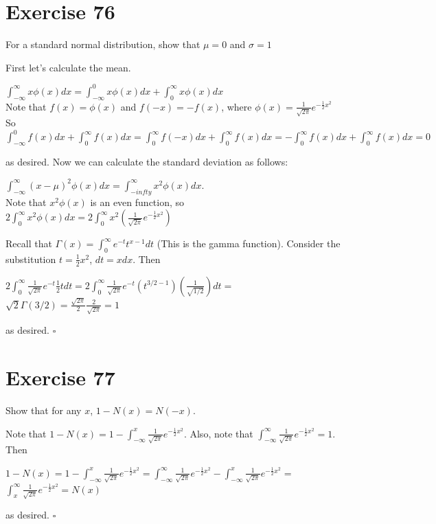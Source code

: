 \documentclass{article}
\begin{document}
\section*{Exercise 76}
For a standard normal distribution, show that $\mu = 0$ and $\sigma = 1$
\begin{flushleft}
    First let's calculate the mean.
    \begin{center}
        $\int_{-\infty}^{\infty} x \phi(x)dx = \int_{-\infty}^{0} x \phi(x)dx + \int_{0}^{\infty} x \phi(x)dx$ \\
        Note that $f(x) = \phi(x)$ and $f(-x) = -f(x)$, where $\phi(x) = \frac{1}{\sqrt{2\pi}} e^{-\frac{1}{2} x^2}$ \\
        So $\int_{-\infty}^{0}f(x)dx + \int_{0}^{\infty}f(x)dx = \int_{0}^{\infty}f(-x)dx + \int_{0}^{\infty}f(x)dx = -\int_{0}^{\infty}f(x)dx + \int_{0}^{\infty}f(x)dx = 0$
    \end{center}
    as desired. Now we can calculate the standard deviation as follows:
    \begin{center}
        $\int_{-\infty}^{\infty} (x-\mu)^2 \phi(x)dx = \int_{-infty}^{\infty} x^2 \phi(x)dx$. \\
        Note that $x^2 \phi(x)$ is an even function, so \\
        $2 \int_{0}^{\infty} x^2 \phi(x)dx = 2\int_{0}^{\infty} x^2 (\frac{1}{\sqrt{2\pi}}e^{-\frac{1}{2} x^2})$
    \end{center}
    Recall that $\Gamma(x) = \int_{0}^{\infty}e^{-t}t^{x-1}dt$ (This is the gamma function). Consider the substitution $t = \frac{1}{2}x^2$, $dt = xdx$. Then
    \begin{center}
        $2 \int_{0}^{\infty} \frac{1}{\sqrt{2\pi}} e^{-t} \frac{1}{2}tdt = 2\int_{0}^{\infty}\frac{1}{\sqrt{2\pi}}e^{-t} (t^{3/2 - 1}) (\frac{1}{\sqrt{1/2}}) dt =$ \\
        $\sqrt{2} \Gamma(3/2) = \frac{\sqrt{2\pi}}{2} \frac{2}{\sqrt{2\pi}} = 1$
    \end{center}
    as desired. $\square$
\end{flushleft}

\section*{Exercise 77}
Show that for any $x$, $1-N(x) = N(-x)$.
\begin{flushleft}
    Note that $1-N(x) = 1 - \int_{-\infty}^{x} \frac{1}{\sqrt{2\pi}}e^{-\frac{1}{2}x^2}$. Also, note that $\int_{-\infty}^{\infty} \frac{1}{\sqrt{2\pi}}e^{-\frac{1}{2}x^2} = 1$. Then
    \begin{center}
        $1 - N(x) = 1 - \int_{-\infty}^{x} \frac{1}{\sqrt{2\pi}}e^{-\frac{1}{2}x^2} = \int_{-\infty}^{\infty} \frac{1}{\sqrt{2\pi}}e^{-\frac{1}{2}x^2} - \int_{-\infty}^{x} \frac{1}{\sqrt{2\pi}}e^{-\frac{1}{2}x^2} = $ \\
        $\int_{x}^{\infty} \frac{1}{\sqrt{2\pi}}e^{-\frac{1}{2}x^2} = N(x)$    
    \end{center}
    as desired. $\square$
\end{flushleft}
\end{document}

